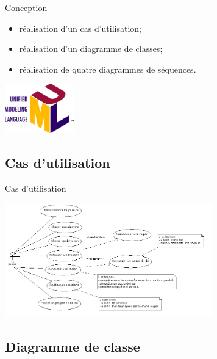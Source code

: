 \documentclass{beamer}
\begin{document}
\begin{frame}{Conception}

	\begin{itemize}
		\item réalisation d'un cas d'utilisation;
		\vspace*{0.2cm}
		\item réalisation d'un diagramme de classes;
		\vspace*{0.2cm}
		\item réalisation de quatre diagrammes de séquences.
	\end{itemize}
	\begin{center}
		\vspace*{0.5cm}
		\includegraphics[width=3cm]{uml.jpg}
	\end{center}
\end{frame}

	\subsection{Cas d'utilisation}
	
\begin{frame}{Cas d'utilisation}

\begin{center}
	\includegraphics[width=9cm]{DiagrammeDeCasDUtilisation.png}
\end{center}

\end{frame}

	\subsection{Diagramme de classe}
	
\end{document}
